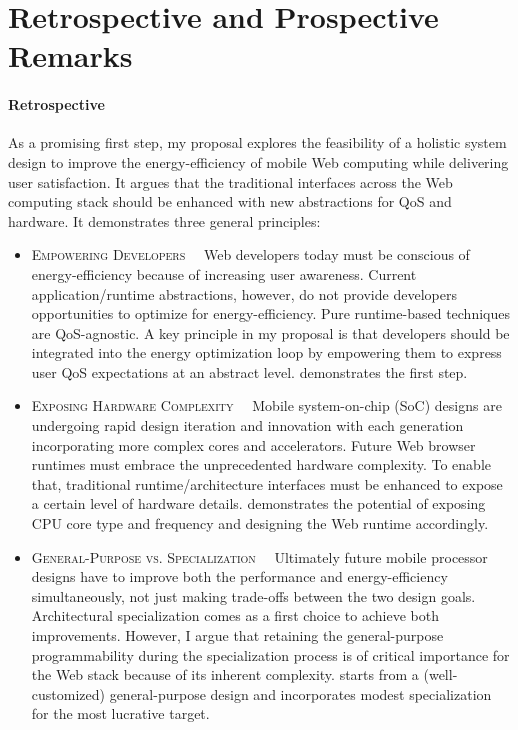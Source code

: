 
\section{Retrospective and Prospective Remarks}
\label{sec:conc}

\paragraph{Retrospective} As a promising first step, my proposal explores the feasibility of a holistic system design to improve the energy-efficiency of mobile Web computing while delivering user satisfaction. It argues that the traditional interfaces across the Web computing stack should be enhanced with new abstractions for QoS and hardware. It demonstrates three general principles:

\begin{itemize}
  \item \textsc{Empowering Developers~~} Web developers today must be conscious of energy-efficiency because of increasing user awareness. Current application/runtime abstractions, however, do not provide developers opportunities to optimize for energy-efficiency. Pure runtime-based techniques are QoS-agnostic. A key principle in my proposal is that developers should be integrated into the energy optimization loop by empowering them to express user QoS expectations at an abstract level. \greenweb demonstrates the first step.
  
  \item \textsc{Exposing Hardware Complexity~~} Mobile system-on-chip (SoC) designs are undergoing rapid design iteration and innovation with each generation incorporating more complex cores and accelerators. Future Web browser runtimes must embrace the unprecedented hardware complexity. To enable that, traditional runtime/architecture interfaces must be enhanced to expose a certain level of hardware details. \webrt demonstrates the potential of exposing CPU core type and frequency and designing the Web runtime accordingly.
  
  \item \textsc{General-Purpose vs. Specialization~~} Ultimately future mobile processor designs have to improve both the performance and energy-efficiency simultaneously, not just making trade-offs between the two design goals. Architectural specialization comes as a first choice to achieve both improvements. However, I argue that retaining the general-purpose programmability during the specialization process is of critical importance for the Web stack because of its inherent complexity. \webcore starts from a (well-customized) general-purpose design and incorporates modest specialization for the most lucrative target.
\end{itemize}

